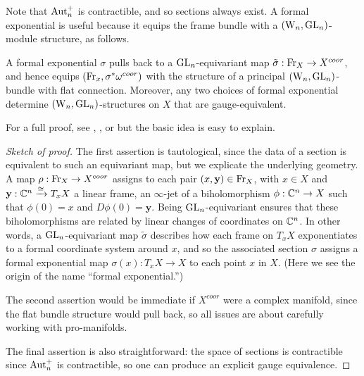 Note that ${\rm Aut}_n^+$ is contractible, and so sections always exist. 
A formal exponential is useful because it equips the frame bundle with a $({{\rm W}_n},{\rm GL}_n)$-module structure, as follows.

% 

\begin{prop} \label{gauge equiv} 
A formal exponential $\sigma$ pulls back to a ${\rm GL}_n$-equivariant map $\tilde{\sigma} : {\rm Fr}_X \to X^{coor}$,
and hence equips $({\rm Fr}_x, \sigma^* \omega^{coor})$ with the structure
of a principal $({{\rm W}_n},{\rm GL}_n)$-bundle with flat connection.
Moreover, any two choices of formal exponential determine $({{\rm W}_n},{\rm GL}_n)$-structures on $X$ that are gauge-equivalent. 
\end{prop}

For a full proof, see \cite{NT}, \cite{nest1995}, or \cite{khors} but the basic idea is easy to explain.

\begin{proof}[Sketch of proof]
The first assertion is tautological, since the data of a section is equivalent to such an equivariant map, but we explicate the underlying geometry.
A map $\rho : {\rm Fr}_X \to X^{coor}$ assigns to each pair  $(x, \mathbf{y}) \in {\rm Fr}_X$,
with $x \in X$ and $\mathbf{y} : \mathbb C^n \xrightarrow{\cong} T_x X$ a linear frame,
an $\infty$-jet of a biholomorphism $\phi: \mathbb C^n \to X$ such that $\phi(0) = x$ and $D\phi(0) = \mathbf{y}$.
Being ${\rm GL}_n$-equivariant ensures that these biholomorphisms are related by linear changes of coordinates on $\mathbb C^n$.
In other words, a ${\rm GL}_n$-equivariant map $\tilde{\sigma}$ describes how each frame on $T_x X$ exponentiates to a formal coordinate system around $x$,
and so the associated section $\sigma$ assigns a formal exponential map $\sigma(x) \colon T_x X \to X$ to each point $x$ in $X$.
(Here we see the origin of the name ``formal exponential.'')

The second assertion would be immediate if $X^{coor}$ were a complex manifold, since the flat bundle structure would pull back,
so all issues are about carefully working with pro-manifolds.

The final assertion is also straightforward: the space of sections is contractible since ${\rm Aut}_n^+$ is contractible, 
so one can produce an explicit gauge equivalence.
\end{proof}


